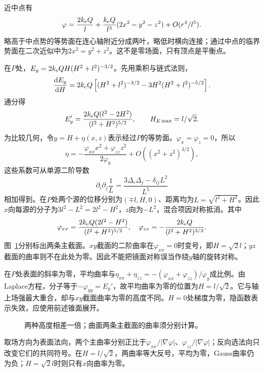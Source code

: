 \begin{solution}
近中点有
\[\varphi=\frac{2k_{\rm e} Q}{l}+\frac{k_{\rm e} Q}{l^3}(2x^2-y^2-z^2)+O(r^4/l^5).
\]
略高于中点势的等势面在连心轴附近分成两叶，略低时横向连接；通过中点的临界势面在二次近似中为$2x^2=y^2+z^2$。这不是零场面，只有顶点是平衡点。

在$P$处，$E_y=2k_{\rm e} QH(H^2+l^2)^{-3/2}$。先用乘积与链式法则，
\[\frac{\mathop{}\!\mathrm d E_y}{\mathop{}\!\mathrm d H}=2k_{\rm e} Q\left[(H^2+l^2)^{-3/2}
-3H^2(H^2+l^2)^{-5/2}\right].\]
通分得
\[E_y'=\frac{2k_{\rm e} Q(l^2-2H^2)}{(l^2+H^2)^{5/2}},\qquad H_{E\max}=l/\sqrt2.
\]
为比较几何，令$y=H+\eta(x,z)$表示经过$P$的等势面。$\varphi_x=\varphi_z=0$，所以
\[\eta=-\frac{\varphi_{xx}x^2+\varphi_{zz}z^2}{2\varphi_y}+O((x^2+z^2)^{3/2}),
\]
这些系数可从单源二阶导数
\[\partial_i\partial_j\frac1{L}
=\frac{3\Delta_i\Delta_j-\delta_{ij}L^2}{L^5}
\]
相加得到。在$P$处两个源的位移分别为$(\mp l,H,0)$、距离均为$L=\sqrt{l^2+H^2}$。因此$x$向每源的分子为$3l^2-L^2=2l^2-H^2$，$z$向为$-L^2$，混合项因对称抵消。其中
\[\varphi_{xx}=\frac{2k_{\rm e} Q(2l^2-H^2)}{(l^2+H^2)^{5/2}},\quad
\varphi_{zz}=-\frac{2k_{\rm e} Q}{(l^2+H^2)^{3/2}}.
\]
图~\ref{fig:es2-e7-s}分别标出两条主截面。$xy$截面的二阶曲率在$\varphi_{xx}=0$时变号，即$H=\sqrt2l$；$yz$截面的曲率则不在此处为零。因此不能把镜面对称误当作绕$y$轴的旋转对称。

在$P$处表面的斜率为零，平均曲率与$\eta_{xx}+\eta_{zz}=-(\varphi_{xx}+\varphi_{zz})/\varphi_y$成比例。由Laplace方程，分子等于$-\varphi_{yy}=E_y'$，故平均曲率为零的位置为$H=l/\sqrt2$。它与轴上场强最大重合，却与$xy$截面曲率为零的高度不同。$H=0$处梯度为零，隐函数表示失效，应使用前述锥面展开。
\begin{figure}[H]\centering
{}
\caption{两种高度相差一倍；曲面两条主截面的曲率须分别计算。}\label{fig:es2-e7-s}
\end{figure}


取场方向为表面法向，两个主曲率分别正比于$\varphi_{xx}/|\nabla\varphi|$、$\varphi_{zz}/|\nabla\varphi|$；反向选法向只改变它们的共同符号。在$H=l/\sqrt2$，两曲率等大反号，平均为零，Gauss曲率仍为负；$H=\sqrt2l$时则只有$x$向曲率为零。


\end{solution}
